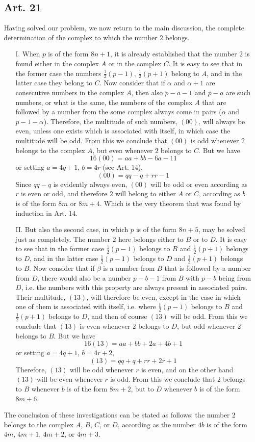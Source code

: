 \documentclass{book}
\theoremstyle{plain}
\theoremstyle{remark}
\begin{document}
\subsection*{Art. 21}
Having solved our problem, we now return to the main discussion, the complete determination of the complex to which the number $2$ belongs.

\begin{enumerate}
\item[I.] When $p$ is of the form $8n+1$, it is already established that the number $2$ is found either in the complex $A$ or in the complex $C$.  It is easy to see that in the former case the numbers $\tfrac{1}{2}(p-1)$, $\tfrac{1}{2}(p+1)$ belong to $A$, and in the latter case they belong to $C$.  Now consider that if $\alpha$ and $\alpha+1$ are consecutive numbers in the complex $A$, then also $p-a-1$ and $p-a$ are such numbers, or what is the same, the numbers of the complex $A$ that are followed by a number from the some complex always come in pairs ($\alpha$ and $p-1-\alpha$).  Therefore, the multitude of such numbers, $(00)$, will always be even, unless one exists which is associated with itself, in which case the multitude will be odd.  From this we conclude that $(00)$ is odd whenever $2$ belongs to the complex $A$, but even whenever $2$ belongs to $C$.   But we have 
\[ 16(00) = aa + bb - 6a - 11 \]
or setting $a = 4q+1$, $b = 4r$ (see Art. 14), 
\[ (00) = qq-q+rr-1 \]
Since $qq-q$ is evidently always even, $(00)$ will be odd or even according as $r$ is even or odd, and therefore $2$ will belong to either $A$ or $C$, according as $b$ is of the form $8m$ or $8m+4$.  Which is the very theorem that was found by induction in Art. 14. 
\item[II.] But also the second case, in which $p$ is of the form $8n+5$, may be solved just as completely.  The number $2$ here belongs either to $B$ or to $D$.  It is easy to see that in the former case $\tfrac{1}{2}(p-1)$ belongs to $B$ and $\tfrac{1}{2}(p+1)$ belongs to $D$, and in the latter case $\tfrac{1}{2}(p-1)$ belongs to $D$ and $\tfrac{1}{2}(p+1)$ belongs to $B$.  Now consider that if $\beta$ is a number from $B$ that is followed by a number from $D$, there would also be a number $p-b-1$ from $B$ with $p-b$ being from $D$, i.e. the numbers with this property are always present in associated pairs.  Their multitude, $(13)$, will therefore be even, except in the case in which one of them is associated with itself, i.e. where $\tfrac{1}{2}(p-1)$ belongs to $B$ and $\tfrac{1}{2}(p+1)$ belongs to $D$, and then of course $(13)$ will be odd.  From this we conclude that $(13)$ is even whenever $2$ belongs to $D$, but odd whenever $2$ belongs to $B$.  But we have 
\[ 16(13) = aa + bb + 2a + 4b +1 \]
or setting $a = 4q+1$, $b = 4r+2$,
\[ (13) = qq + q + rr + 2r + 1 \]
Therefore, $(13)$ will be odd whenever $r$ is even, and on the other hand $(13)$ will be even whenever $r$ is odd.  From this we conclude that $2$ belongs to $B$ whenever $b$ is of the form $8m+2$, but to $D$ whenever $b$ is of the form $8m+6$.  
\end{enumerate}
The conclusion of these investigations can be stated as follows: the number $2$ belongs to the complex $A$, $B$, $C$, or $D$, according as the number $4b$ is of the form $4m$, $4m+1$, $4m+2$, or $4m+3$.
\end{document}
